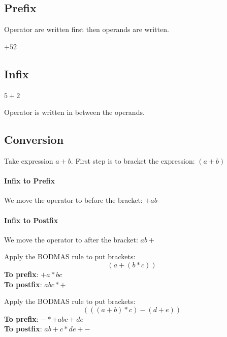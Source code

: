 \subsection{Prefix}
\label{ssec:prefix}
Operator are written first then operands are written.
\begin{eg}
  \(+52\)
\end{eg}
\subsection{Infix}
\label{ssec:infix}
\begin{eg}
  \(5+2\)
\end{eg}
Operator is written in between the operands.

\subsection{Conversion}
\label{ssec:conversion}
Take expression \(a+b\).
First step is to bracket the expression: \((a+b)\)

\paragraph{Infix to Prefix}
We move the operator to before the bracket: \(+ab\)

\paragraph{Infix to Postfix}
We move the operator to after the bracket: \(ab+\)

\begin{eg}[\(a+b*c\)]
  Apply the BODMAS rule to put brackets: \[(a+(b*c))\]
  \textbf{To prefix}:
  \(+a*bc\)\\
  \textbf{To postfix}:
  \(abc*+\)
\end{eg}

\begin{eg}[\((a+b)*c-d+e\)]
  Apply the BODMAS rule to put brackets: \[(((a+b)*c)-(d+e))\]
  \textbf{To prefix}:
  \(-*+abc+de\)\\
  \textbf{To postfix}:
  \( ab+c*de+- \)
\end{eg}
